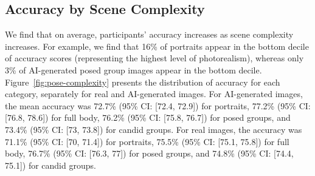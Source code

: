 \subsection{Accuracy by Scene Complexity} \label{sec:acc-scene-complexity}

We find that on average, participants' accuracy increases as scene complexity increases. For example, we find that 16\% of portraits appear in the bottom decile of accuracy scores (representing the highest level of photorealism), whereas only 3\% of AI-generated posed group images appear in the bottom decile. Figure~\ref{fig:pose-complexity} presents the distribution of accuracy for each category, separately for real and AI-generated images. For AI-generated images, the mean accuracy was 72.7\% (95\% CI: [72.4, 72.9]) for portraits, 77.2\% (95\% CI: [76.8, 78.6]) for full body, 76.2\% (95\% CI: [75.8, 76.7]) for posed groups, and 73.4\% (95\% CI: [73, 73.8]) for candid groups. For real images, the accuracy was 71.1\% (95\% CI: [70, 71.4]) for portraits, 75.5\% (95\% CI: [75.1, 75.8]) for full body, 76.7\% (95\% CI: [76.3, 77]) for posed groups, and 74.8\% (95\% CI: [74.4, 75.1]) for candid groups. 

